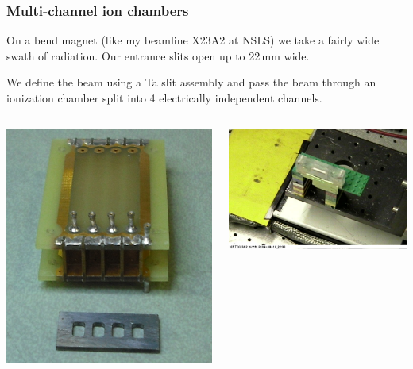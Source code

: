 \documentclass[10pt, xcolor=x11names, compress, handout]{beamer}
\begin{document}
\begin{frame}
  \frametitle{Multi-channel ion chambers}
  
  On a bend magnet (like my beamline X23A2 at NSLS) we take a fairly
  wide swath of radiation.  Our entrance slits open up to 22\,mm wide.

  \bigskip

  We define the beam using a Ta slit assembly and pass the beam
  through an ionization chamber split into 4 electrically independent
  channels.

  \smallskip

  \begin{columns}
    \begin{column}{0.4\linewidth}
      \includegraphics[width=\linewidth]{JM/slits.jpg}
    \end{column}
    \begin{column}{0.6\linewidth}
      \includegraphics[width=\linewidth]{JM/4beams.jpg}

\end{column}
\end{columns}
\end{frame}
\end{document}
